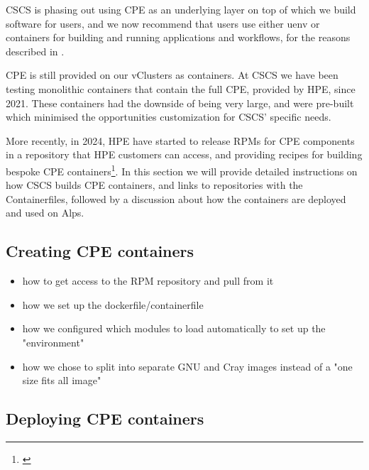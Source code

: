 CSCS is phasing out using CPE as an underlying layer on top of which we build software for users, and we now recommend that users use either uenv or containers for building and running applications and workflows, for the reasons described in .

CPE is still provided on our vClusters as containers.
At CSCS we have been testing monolithic containers that contain the full CPE, provided by HPE, since 2021.
These containers had the downside of being very large, and were pre-built which minimised the opportunities customization for CSCS' specific needs.

More recently, in 2024, HPE have started to release RPMs for CPE components in a repository that HPE customers can access, and providing recipes for building bespoke CPE containers\footnote{\href{https://cpe.ext.hpe.com/docs/latest/install/installation-guidance-container.html}{}}.
In this section we will provide detailed instructions on how CSCS builds CPE containers, and links to repositories with the Containerfiles, followed by a discussion about how the containers are deployed and used on Alps.

\subsection{Creating CPE containers}
\label{sec:cpe-container-create}

\begin{itemize}
    \item how to get access to the RPM repository and pull from it
    \item how we set up the dockerfile/containerfile
    \item how we configured which modules to load automatically to set up the "environment"
    \item how we chose to split into separate GNU and Cray images instead of a "one size fits all image"
\end{itemize}

\subsection{Deploying CPE containers}
\label{sec:cpe-container-deploy}

